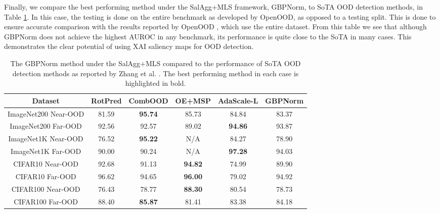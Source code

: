 \documentclass[runningheads]{llncs}
\begin{document}
Finally, we compare the best performing method under the SalAgg+MLS framework, GBPNorm, to SoTA OOD detection methods, in Table \ref{table:sota}. In this case, the testing is done on the entire benchmark as developed by OpenOOD, as opposed to a testing split. This is done to ensure accurate comparison with the results reported by OpenOOD \cite{openood15}, which use the entire dataset. From this table we see that although GBPNorm does not achieve the highest AUROC in any benchmark, its performance is quite close to the SoTA in many cases. This demonstrates the clear potential of using XAI saliency maps for OOD detection.


\begin{table}[hbtp]
\setlength\tabcolsep{3pt}
\begin{center}
\begin{tabular}{ |c|c|c|c|c|c| }
    \hline
    Dataset & RotPred & CombOOD & OE+MSP & AdaScale-L & GBPNorm \\
    \hline
    \hline
    \rowcolor{near!50}
    ImageNet200 Near-OOD & 81.59 & \textbf{95.74} & 85.73 & 84.84 & 83.37 \\
    \hline
    \rowcolor{far!50}
    ImageNet200 Far-OOD & 92.56 & 92.57 & 89.02 & \textbf{94.86} & 93.87 \\
    \hline
    \hline
    \rowcolor{near!50}
    ImageNet1K Near-OOD & 76.52 & \textbf{95.22} & N/A & 84.27 & 78.90 \\
    \hline
    \rowcolor{far!50}
    ImageNet1K Far-OOD & 90.00 & 90.24 & N/A & \textbf{97.28} & 94.03 \\
    \hline
    \hline
    \rowcolor{near!50}
    CIFAR10 Near-OOD & 92.68 & 91.13 & \textbf{94.82} & 74.99 & 89.90 \\
    \hline
    \rowcolor{far!50}
    CIFAR10 Far-OOD & 96.62 & 94.65 & \textbf{96.00} & 79.02 & 94.92 \\
    \hline
    \hline
    \rowcolor{near!50}
    CIFAR100 Near-OOD & 76.43 & 78.77 & \textbf{88.30} & 80.54 & 78.73 \\
    \hline
    \rowcolor{far!50}
    CIFAR100 Far-OOD & 88.40 & \textbf{85.87} & 81.41 & 83.38 & 84.18 \\
    \hline
    \end{tabular}
    \caption[Wilcoxon Test for SalAgg+MLS on ImageNet200]{The GBPNorm method under the SalAgg+MLS compared to the performance of SoTA OOD detection methods as reported by Zhang et al. \cite{openood15}. The best performing method in each case is highlighted in bold. }
    \label{table:sota}
\end{center}
\setlength\tabcolsep{6pt}
\end{table}
\end{document}

